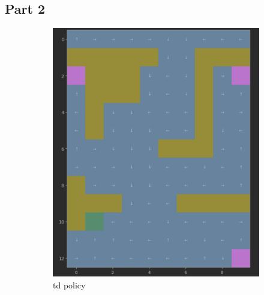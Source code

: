 \documentclass{article}
\begin{document}
    \subsection{Part 2}\label{subsec:question-3-2}
    \begin{figure}[h]
        \begin{subfigure} {0.5\textwidth}
            \includegraphics[width=0.9\linewidth]{images/mc_policy}
            \caption{td policy}\label{fig:td_policy}
        \end{subfigure}
        \begin{subfigure} {0.5\textwidth}

\end{subfigure}
\end{figure}
\end{document}
